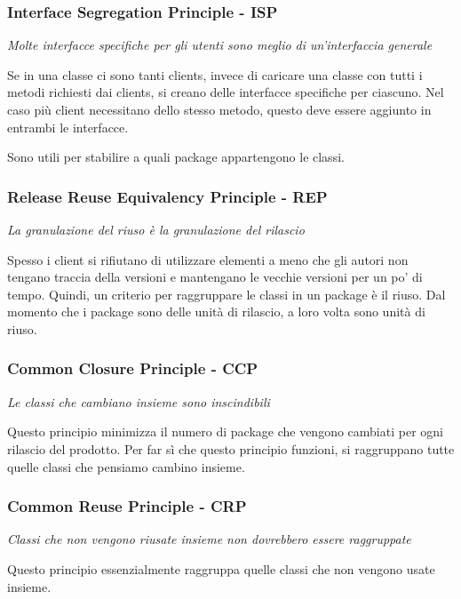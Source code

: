 {    \subsubsection{Interface Segregation Principle - ISP}
    \textit{Molte interfacce specifiche per gli utenti sono meglio di un'interfaccia generale}
    
    Se in una classe ci sono tanti clients, invece di caricare una classe con tutti i metodi richiesti dai clients, si
    creano delle interfacce specifiche per ciascuno. Nel caso più client necessitano dello stesso metodo, questo deve
    essere aggiunto in entrambi le interfacce.

    Sono utili per stabilire a quali package appartengono le classi.
    
    \subsubsection{Release Reuse Equivalency Principle - REP}
    \textit{La granulazione del riuso è la granulazione del rilascio}
    
    Spesso i client si rifiutano di utilizzare elementi a meno che gli autori non tengano traccia della versioni e
    mantengano le vecchie versioni per un po' di tempo. Quindi, un criterio per raggruppare le classi in un package è il riuso.
    Dal momento che i package sono delle unità di rilascio, a loro volta sono unità di riuso.
    
    \subsubsection{Common Closure Principle - CCP}
    \textit{Le classi che cambiano insieme sono inscindibili}
    
    Questo principio minimizza il numero di package che vengono cambiati per ogni rilascio del prodotto. Per far sì che
    questo principio funzioni, si raggruppano tutte quelle classi che pensiamo cambino insieme.
    
    \subsubsection{Common Reuse Principle - CRP}
    \textit{Classi che non vengono riusate insieme non dovrebbero essere raggruppate}

    Questo principio essenzialmente raggruppa quelle classi che non vengono usate insieme.
    
}
